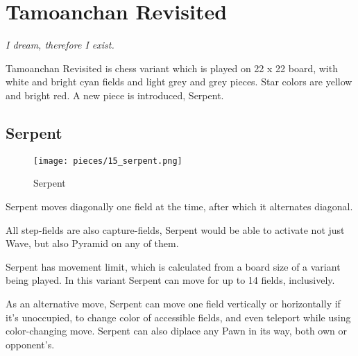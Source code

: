 

\chapter*{Tamoanchan Revisited}
\label{ch:Tamoanchan Revisited}

\begin{flushright}
\parbox{0.6\textwidth}{
\emph{I dream, therefore I exist.\newline
{} } }
\end{flushright}

\noindent
Tamoanchan Revisited is chess variant which is played on 22 x 22 board,
with white and bright cyan fields and light grey and grey pieces.
Star colors are yellow and bright red.
A new piece is introduced, Serpent.

\clearpage %

\section*{Serpent}
\label{sec:Tamoanchan Revisited/Serpent}

\vspace*{-0.7\baselineskip}
\noindent
\begin{wrapfigure}[11]{l}{0.4\textwidth}
\centering
\texttt{[image: pieces/15\_serpent.png]}
\caption{Serpent}
\label{fig:15_serpent}
\end{wrapfigure}
Serpent moves diagonally one field at the time, after which it alternates
diagonal.

All step-fields are also capture-fields, Serpent would be able to activate
not just Wave, but also Pyramid on any of them.

Serpent has movement limit, which is calculated from a board size of a variant
being played. In this variant Serpent can move for up to 14 fields, inclusively.

As an alternative move, Serpent can move one field vertically or horizontally
if it's unoccupied, to change color of accessible fields, and even teleport
while using color-changing move. Serpent can also diplace any Pawn in its way,
both own or opponent's.

